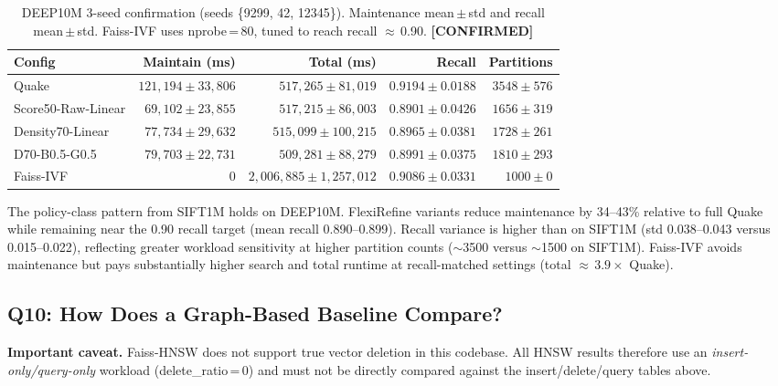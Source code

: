\documentclass[sigconf, nonacm]{acmart}
\begin{document}
\begin{table}[h]
\centering
\caption{DEEP10M 3-seed confirmation (seeds \{9299, 42, 12345\}).
  Maintenance mean\,$\pm$\,std and recall mean\,$\pm$\,std.
  Faiss-IVF uses nprobe\,=\,80, tuned to reach recall $\approx$\,0.90.
  \textbf{[CONFIRMED]}}
\label{tab:deep10m_confirmation}
\begin{tabular}{lrrrr}
  \toprule
  Config & Maintain (ms) & Total (ms) & Recall & Partitions \\
  \midrule
  Quake
    & $121{,}194 \pm 33{,}806$
    & $517{,}265 \pm 81{,}019$
    & $0.9194 \pm 0.0188$
    & $3548 \pm 576$ \\
  Score50-Raw-Linear
    & $69{,}102 \pm 23{,}855$
    & $517{,}215 \pm 86{,}003$
    & $0.8901 \pm 0.0426$
    & $1656 \pm 319$ \\
  Density70-Linear
    & $77{,}734 \pm 29{,}632$
    & $515{,}099 \pm 100{,}215$
    & $0.8965 \pm 0.0381$
    & $1728 \pm 261$ \\
  D70-B0.5-G0.5
    & $79{,}703 \pm 22{,}731$
    & $509{,}281 \pm 88{,}279$
    & $0.8991 \pm 0.0375$
    & $1810 \pm 293$ \\
  Faiss-IVF
    & $0$
    & $2{,}006{,}885 \pm 1{,}257{,}012$
    & $0.9086 \pm 0.0331$
    & $1000 \pm 0$ \\
  \bottomrule
\end{tabular}
\end{table}

The policy-class pattern from SIFT1M holds on DEEP10M.
FlexiRefine variants reduce maintenance by 34--43\% relative to
full Quake while remaining near the 0.90 recall target (mean recall
0.890--0.899). Recall variance is higher than on SIFT1M (std
0.038--0.043 versus 0.015--0.022), reflecting greater workload
sensitivity at higher partition counts ($\sim$3500 versus
$\sim$1500 on SIFT1M). Faiss-IVF avoids maintenance but pays
substantially higher search and total runtime at recall-matched
settings (total $\approx\,3.9\times$ Quake).

\subsection{Q10: How Does a Graph-Based Baseline Compare?}
\label{sec:eval_hnsw}


\textbf{Important caveat.}
Faiss-HNSW does not support true vector deletion in this codebase.
All HNSW results therefore use an \emph{insert-only/query-only}
workload (delete\_ratio\,=\,0) and must not be directly compared
against the insert/delete/query tables above.
\end{document}
